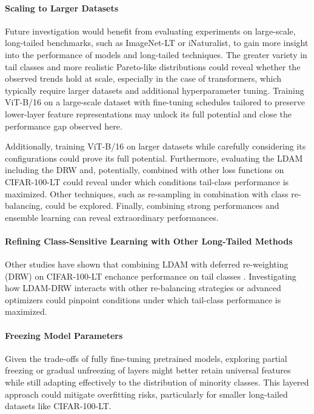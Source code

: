 \paragraph{Scaling to Larger Datasets}
Future investigation would benefit from evaluating experiments on large-scale, long-tailed benchmarks, such as ImageNet-LT or iNaturalist, to gain more insight into the performance of models and long-tailed techniques. The greater variety in tail classes and more realistic Pareto-like distributions could reveal whether the observed trends hold at scale, especially in the case of transformers, which typically require larger datasets and additional hyperparameter tuning. Training ViT-B/16 on a large-scale dataset with fine-tuning schedules tailored to preserve lower-layer feature representations may unlock its full potential and close the performance gap observed here.

Additionally, training ViT-B/16 on larger datasets while carefully considering its configurations could prove its full potential. Furthermore, evaluating the LDAM including the DRW and, potentially, combined with other loss functions on CIFAR-100-LT could reveal under which conditions tail-class performance is maximized. Other techniques, such as re-sampling in combination with class re-balancing, could be explored. Finally, combining strong performances and ensemble learning can reveal extraordinary performances.

\paragraph{Refining Class-Sensitive Learning with Other Long-Tailed Methods}
Other studies have shown that combining LDAM with deferred re-weighting (DRW) on CIFAR-100-LT enchance performance on tail classes \cite{cao2019learningimbalanceddatasetslabeldistributionaware,menon2021longtaillearninglogitadjustment}. Investigating how LDAM-DRW interacts with other re-balancing strategies or advanced optimizers could pinpoint conditions under which tail-class performance is maximized.

\paragraph{Freezing Model Parameters}
Given the trade-offs of fully fine-tuning pretrained models, exploring partial freezing or gradual unfreezing of layers might better retain universal features while still adapting effectively to the distribution of minority classes. This layered approach could mitigate overfitting risks, particularly for smaller long-tailed datasets like CIFAR-100-LT.

